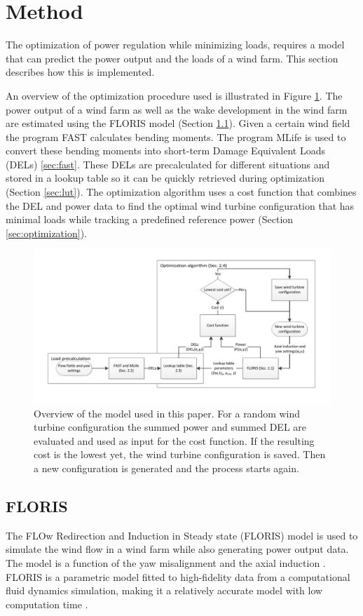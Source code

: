 \section{Method} \label{sec:method}
The optimization of power regulation while minimizing loads, requires a model that can predict the power output and the loads of a wind farm. This section describes how this is implemented.

An overview of the optimization procedure used is illustrated in Figure \ref{fig:optim}.
The power output of a wind farm as well as the wake development in the wind farm are estimated using the FLORIS model \cite{Gebraad2016} (Section \ref{sec:floris}). Given a certain wind field the program FAST calculates bending moments. The program MLife is used to convert these bending moments into short-term Damage Equivalent Loads (DELs) \ref{sec:fast}. These DELs are precalculated for different situations and stored in a lookup table so it can be quickly retrieved during optimization (Section \ref{sec:lut}). The optimization algorithm uses a cost function that combines the DEL and power data to find the optimal wind turbine configuration that has minimal loads while tracking a predefined reference power (Section \ref{sec:optimization}).

\begin{figure}[h]
	\includegraphics[width=\linewidth]{./Figures/OptimizationProcess.pdf}
	\caption{Overview of the model used in this paper. For a random wind turbine configuration the summed power and summed DEL are evaluated and used as input for the cost function. If the resulting cost is the lowest yet, the wind turbine configuration is saved. Then a new configuration is generated and the process starts again.}
	\label{fig:optim}
\end{figure}

\subsection{FLORIS} \label{sec:floris} The FLOw Redirection and Induction in Steady state (FLORIS) model is used to simulate the wind flow in a wind farm while also generating power output data. The model is a function of the yaw misalignment and the axial induction \cite{Gebraad2016}. FLORIS is a parametric model fitted to high-fidelity data from a computational fluid dynamics simulation, making it a relatively accurate model with low computation time \cite{Dijk2016}. 

